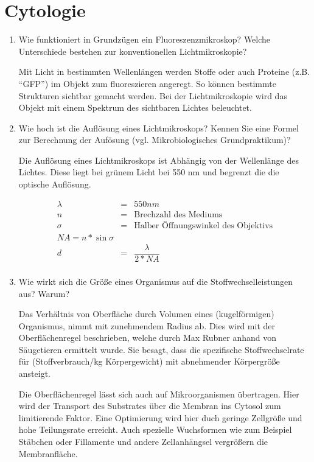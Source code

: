 
\section{Cytologie}
\label{sec:cytologie}
\begin{enumerate}
	\item Wie funktioniert in Grundzügen ein Fluoreszenzmikroskop? Welche Unterschiede bestehen zur konventionellen Lichtmikroskopie?

		Mit Licht in bestimmten Wellenlängen werden Stoffe
		oder auch Proteine (z.B. ``GFP'') im Objekt zum	fluoreszieren angeregt.
		So können bestimmte Strukturen sichtbar gemacht werden.
		Bei der Lichtmikroskopie wird das Objekt mit einem Spektrum des sichtbaren Lichtes
		beleuchtet.

	\item\label{tab:quest_cyt_resolution} Wie hoch ist die Auflösung eines Lichtmikroskops?
		Kennen Sie eine Formel zur Berechnung der Aufösung (vgl. Mikrobiologisches Grundpraktikum)?

	Die Auflösung eines Lichtmikroskops ist Abhängig von der Wellenlänge des Lichtes.
	Diese liegt bei grünem Licht bei 550 nm und begrenzt die die optische Auflösung.

	\begin{center}
	\begin{eqnarray*}
		\lambda &=& 550 nm \\
		n &=& \text{Brechzahl des Mediums} \\
		\sigma &=& \text{Halber \"Offnungswinkel des Objektivs} \\
		NA = n * \sin{\sigma}\\
		d &=& \dfrac{\lambda}{2*NA} \\
	\end{eqnarray*}
	\end{center}

	\item Wie wirkt sich die Größe eines Organismus auf die Stoffwechselleistungen aus? Warum?
		
		Das Verhältnis von Oberfläche durch Volumen eines (kugelförmigen) Organismus,
		nimmt mit zunehmendem Radius ab.
		Dies wird mit der Oberflächenregel beschrieben, welche durch Max Rubner anhand von Säugetieren ermittelt wurde.
		Sie besagt, dass die spezifische Stoffwechselrate für (Stoffverbrauch/kg Körpergewicht)
		mit abnehmender Körpergröße ansteigt.

		Die Oberflächenregel lässt sich auch auf Mikroorganismen übertragen.
		Hier wird der Transport des Substrates über die Membran ins Cytosol zum limitierende Faktor.
		Eine Optimierung wird hier duch geringe Zellgröße und hohe Teilungsrate erreicht.
		Auch spezielle Wuchsformen wie zum Beispiel Stäbchen
		oder Fillamente und andere Zellanhängsel vergrößern die Membranfläche.


\end{enumerate}
